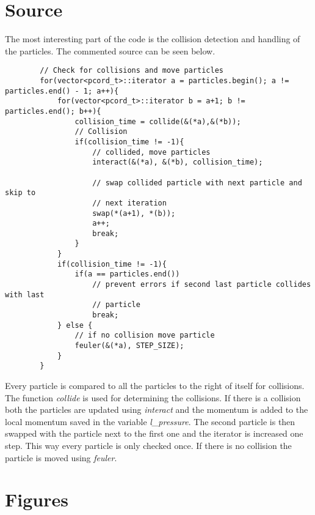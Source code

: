 \documentclass[a4paper, 12pt]{article}
\begin{document}
\section{Source}
\label{sec:src}
The most interesting part of the code is the collision detection and handling of
the particles. The commented source can be seen below.
\begin{lstlisting}
        // Check for collisions and move particles
        for(vector<pcord_t>::iterator a = particles.begin(); a != particles.end() - 1; a++){
            for(vector<pcord_t>::iterator b = a+1; b != particles.end(); b++){
                collision_time = collide(&(*a),&(*b));
                // Collision
                if(collision_time != -1){
                    // collided, move particles
                    interact(&(*a), &(*b), collision_time);

                    // swap collided particle with next particle and skip to
                    // next iteration
                    swap(*(a+1), *(b));
                    a++;
                    break;
                }
            }
            if(collision_time != -1){
                if(a == particles.end())
                    // prevent errors if second last particle collides with last
                    // particle
                    break;
            } else {
                // if no collision move particle
                feuler(&(*a), STEP_SIZE);
            }
        }
\end{lstlisting}

Every particle is compared to all the particles to the right of itself for
collisions. The function \textit{collide} is used for determining the
collisions. If there is a collision both the particles are updated using
\textit{interact} and the momentum is added to the local momentum saved in the
variable \textit{l\_pressure}. The second particle is then swapped with the
particle next to the first one and the iterator is increased one step. This way
every particle is only checked once. If there is no collision the particle is
moved using \textit{feuler}.

\newpage
\appendix
\section{Figures}
\label{sec:fig}
\end{document}
